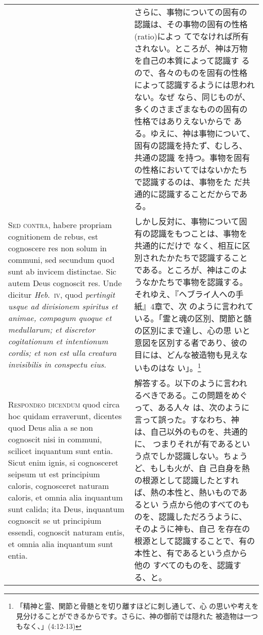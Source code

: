 \documentclass[10pt]{jsarticle} %
\begin{document}
\begin{longtable}{p{21em}p{21em}}
&

さらに、事物についての固有の認識は、その事物の固有の性格(ratio)によっ
てでなければ所有されない。ところが、神は万物を自己の本質によって認識す
るので、各々のものを固有の性格によって認識するようには思われない。なぜ
なら、同じものが、多くのさまざまなものの固有の性格ではありえないからで
ある。ゆえに、神は事物について、固有の認識を持たず、むしろ、共通の認識
を持つ。事物を固有の性格においてではないかたちで認識するのは、事物をた
だ共通的に認識することだからである。

\\


{\scshape Sed contra}, habere propriam cognitionem de rebus, est
cognoscere res non solum in communi, sed secundum quod sunt ab invicem
distinctae. Sic autem Deus cognoscit res. Unde dicitur {\itshape
Heb}.~{\scshape iv}, quod {\itshape pertingit usque ad divisionem
spiritus et animae, compagum quoque et medullarum; et discretor
cogitationum et intentionum cordis; et non est ulla creatura
invisibilis in conspectu eius}.


&

しかし反対に、事物について固有の認識をもつことは、事物を共通的にだけで
なく、相互に区別されたかたちで認識することである。ところが、神はこのよ
うなかたちで事物を認識する。それゆえ、『ヘブライ人への手紙』4章で、次
のように言われている。「霊と魂の区別、関節と髄の区別にまで達し、心の思
いと意図を区別する者であり、彼の目には、どんな被造物も見えないものはな
い」。\footnote{「精神と霊、関節と骨髄とを切り離すほどに刺し通して、心
の思いや考えを見分けることができるからです。さらに、神の御前では隠れた
被造物は一つもなく、」(4:12-13)}


\\


{\scshape Respondeo dicendum} quod circa hoc quidam erraverunt,
dicentes quod Deus alia a se non cognoscit nisi in communi, scilicet
inquantum sunt entia. Sicut enim ignis, si cognosceret seipsum ut est
principium caloris, cognosceret naturam caloris, et omnia alia
inquantum sunt calida; ita Deus, inquantum cognoscit se ut principium
essendi, cognoscit naturam entis, et omnia alia inquantum sunt entia.

&

解答する。以下のように言われるべきである。この問題をめぐって、ある人々
は、次のように言って誤った。すなわち、神は、自己以外のものを、共通的に、
つまりそれが有であるという点でしか認識しない。ちょうど、もしも火が、自
己自身を熱の根源として認識したとすれば、熱の本性と、熱いものであるとい
う点から他のすべてのものを、認識しただろうように、そのように神も、自己
を存在の根源として認識することで、有の本性と、有であるという点から他の
すべてのものを、認識する、と。


\end{longtable}
\end{document}
